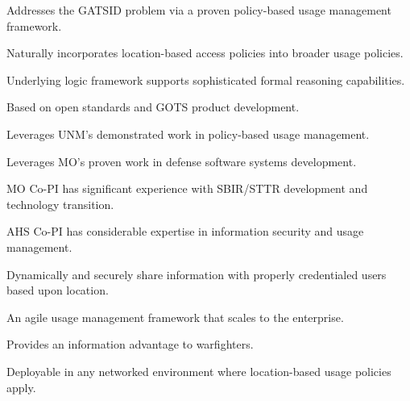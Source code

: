 \documentclass{sbir}
\begin{document}
\begin{evalbox}
  \begin{evalitemize}
     \item Addresses the GATSID problem via a proven policy-based usage management framework.
     \item Naturally incorporates location-based access policies into broader usage policies.
     \item Underlying logic framework supports sophisticated formal reasoning capabilities.
  \end{evalitemize}
  \begin{evalitemize}
     \item Based on open standards and GOTS product development.
     \item Leverages UNM's demonstrated work in policy-based usage management.
     \item Leverages MO's proven work in defense software systems development.
  \end{evalitemize}
  \begin{evalitemize}
     \item MO Co-PI has significant experience with SBIR/STTR development and technology transition.
     \item AHS Co-PI has considerable expertise in information security and usage management.
  \end{evalitemize}
  \begin{evalitemize}
     \item Dynamically and securely share information with properly credentialed users based upon location.
     \item An agile usage management framework that scales to the enterprise.
     \item Provides an information advantage to warfighters.
  \end{evalitemize}
  \begin{evalitemize}
     \item Deployable in any networked environment where location-based usage policies apply.
  \end{evalitemize}
\end{evalbox}
\end{document}
